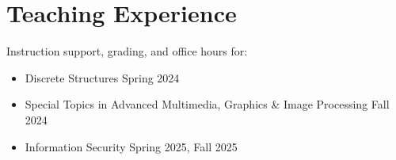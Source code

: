 \section{Teaching Experience}
Instruction support, grading, and office hours for:
\begin{itemize}
  \item Discrete Structures \hfill Spring 2024
  \item Special Topics in Advanced Multimedia, Graphics \& Image Processing \hfill Fall 2024
  \item Information Security \hfill Spring 2025, Fall 2025
\end{itemize}
